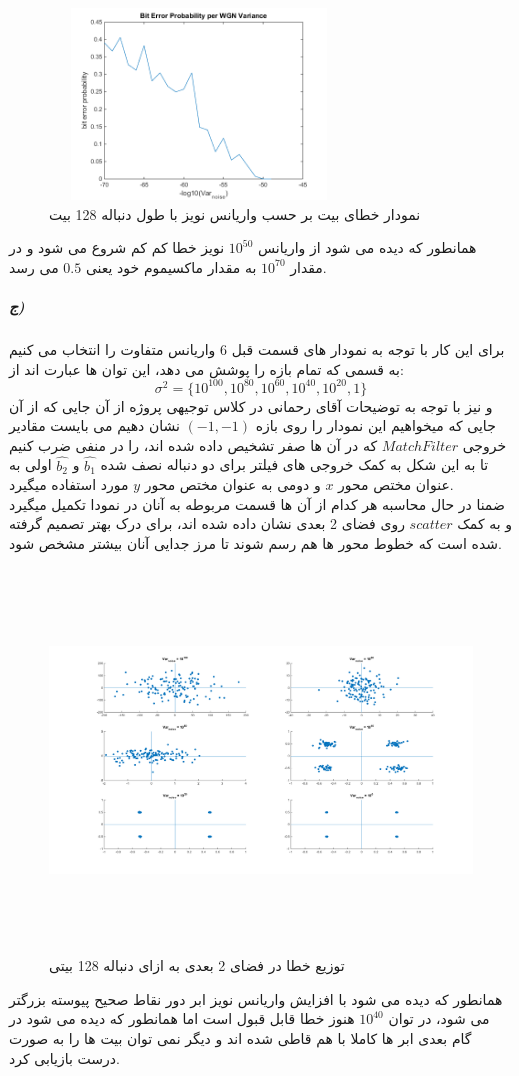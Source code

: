 \documentclass[a4paper,12pt]{article}
\begin{document}
\begin{figure}[htbp]
\centerline{\includegraphics[width=3.125in, height=2in]{../3.Transferring0and1/Q1PB_128.png}}
\caption{نمودار خطای بیت بر حسب واریانس نویز با طول دنباله 128 بیت}
\label{fig}
\end{figure}
همانطور که دیده می شود از واریانس $10^{50}$ نویز خطا کم کم شروع می شود و در مقدار $10^{70}$ به مقدار ماکسیموم خود یعنی $0.5$ می رسد.
\clearpage
\subparagraph{ج)}
برای این کار با توجه به نمودار های قسمت قبل 6 واریانس متفاوت را انتخاب می کنیم به قسمی  که تمام بازه را پوشش می دهد، این توان ها عبارت اند از:
$$
\sigma^2 = \{10^{100}, 10^{80}, 10^{60}, 10^{40}, 10^{20}, 1\}
$$
و نیز با توجه به توضیحات آقای رحمانی در کلاس توجیهی پروژه از آن جایی که از آن جایی که میخواهیم این نمودار را روی بازه $(-1,-1)$ نشان دهیم می بایست مقادیر خروجی $MatchFilter$ که در آن ها صفر تشخیص داده شده اند، را در منفی ضرب کنیم تا به این شکل به کمک خروجی های فیلتر برای دو دنباله نصف شده $\hat{b_1}$ و $\hat{b_2}$ اولی به عنوان مختص محور $x$ و دومی به عنوان مختص محور $y$ مورد استفاده میگیرد.
\\
ضمنا در حال محاسبه هر کدام از آن ها قسمت مربوطه به آنان در نمودا تکمیل میگیرد و به کمک $scatter$ روی فضای 2 بعدی نشان داده شده اند، برای درک بهتر تصمیم گرفته شده است که خطوط محور ها هم رسم شوند تا مرز جدایی آنان بیشتر مشخص شود.
\begin{figure}[htbp]
\centerline{\includegraphics[width=6.625in, height=4in]{../3.Transferring0and1/Q1PC.png}}
\caption{توزیع خطا در فضای 2 بعدی به ازای دنباله 128 بیتی}
\label{fig}
\end{figure}
همانطور که دیده می شود با افزایش واریانس نویز ابر دور نقاط صحیح پیوسته بزرگتر می شود، در توان $10^{40}$ هنوز خطا قابل قبول است اما همانطور که دیده می شود در گام بعدی ابر ها کاملا با هم قاطی شده اند و دیگر نمی توان بیت ها را به صورت درست بازیابی کرد.
\clearpage
\end{document}
